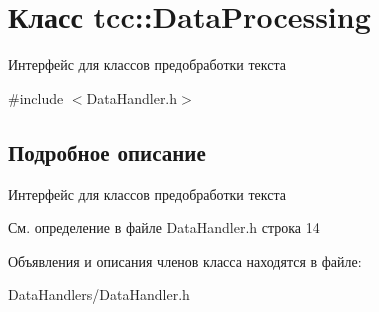 \hypertarget{classtcc_1_1_data_processing}{}\section{Класс tcc\+:\+:Data\+Processing}
\label{classtcc_1_1_data_processing}


Интерфейс для классов предобработки текста  




{\ttfamily \#include $<$Data\+Handler.\+h$>$}



\subsection{Подробное описание}
Интерфейс для классов предобработки текста 

См. определение в файле Data\+Handler.\+h строка 14



Объявления и описания членов класса находятся в файле\+:\begin{DoxyCompactItemize}
\item 
Data\+Handlers/Data\+Handler.\+h\end{DoxyCompactItemize}
